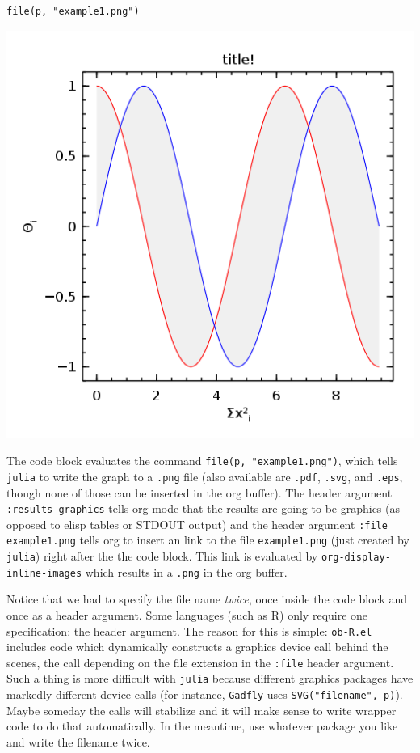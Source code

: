 \documentclass[11pt]{article}
\begin{document}
\begin{verbatim}
file(p, "example1.png")
\end{verbatim}

\includegraphics[width=.9\linewidth]{example1.png}

The code block evaluates the command \texttt{file(p, "example1.png")}, which
tells \texttt{julia} to write the graph to a \texttt{.png} file (also available are
\texttt{.pdf}, \texttt{.svg}, and \texttt{.eps}, though none of those can be inserted in
the org buffer).  The header argument \texttt{:results graphics} tells
org-mode that the results are going to be graphics (as opposed to
elisp tables or STDOUT output) and the header argument \texttt{:file
example1.png} tells org to insert an link to the file \texttt{example1.png}
(just created by \texttt{julia}) right after the the code block.  This link
is evaluated by \texttt{org-display-inline-images} which results in a \texttt{.png}
in the org buffer.

Notice that we had to specify the file name \emph{twice}, once inside the
code block and once as a header argument.  Some languages (such as R)
only require one specification: the header argument.  The reason for
this is simple: \texttt{ob-R.el} includes code which dynamically constructs a
graphics device call behind the scenes, the call depending on the file
extension in the \texttt{:file} header argument.  Such a thing is more
difficult with \texttt{julia} because different graphics packages have
markedly different device calls (for instance, \texttt{Gadfly} uses
\texttt{SVG("filename", p)}).  Maybe someday the calls will stabilize and it
will make sense to write wrapper code to do that automatically.  In
the meantime, use whatever package you like and write the filename
twice.
\end{document}
